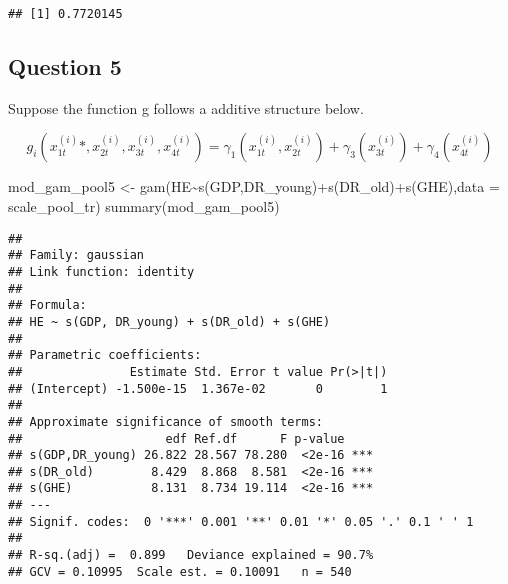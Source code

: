 \documentclass[
]{article}
\newenvironment{Shaded}{\begin{snugshade}}{\end{snugshade}}
\newcommand{\AttributeTok}[1]{\textcolor[rgb]{0.77,0.63,0.00}{#1}}
\newcommand{\DecValTok}[1]{\textcolor[rgb]{0.00,0.00,0.81}{#1}}
\newcommand{\FunctionTok}[1]{\textcolor[rgb]{0.00,0.00,0.00}{#1}}
\newcommand{\NormalTok}[1]{#1}
\newcommand{\OtherTok}[1]{\textcolor[rgb]{0.56,0.35,0.01}{#1}}
\newcommand{\SpecialCharTok}[1]{\textcolor[rgb]{0.00,0.00,0.00}{#1}}
\begin{document}
\begin{Shaded}
\end{Shaded}

\begin{verbatim}
## [1] 0.7720145
\end{verbatim}

\hypertarget{question-5}{%
\subsection{Question 5}\label{question-5}}

Suppose the function g follows a additive structure below.

\[
g_i(x^{(i)}_{1t}*,x^{(i)}_{2t}, x^{(i)}_{3t}, x^{(i)}_{4t}) = \gamma_1(x^{(i)}_{1t},x^{(i)}_{2t})+ \gamma_3(x^{(i)}_{3t})+\gamma_4(x^{(i)}_{4t}) 
\]

\begin{Shaded}
\begin{Highlighting}[]
\NormalTok{mod\_gam\_pool5 }\OtherTok{\textless{}{-}} \FunctionTok{gam}\NormalTok{(HE}\SpecialCharTok{\textasciitilde{}}\FunctionTok{s}\NormalTok{(GDP,DR\_young)}\SpecialCharTok{+}\FunctionTok{s}\NormalTok{(DR\_old)}\SpecialCharTok{+}\FunctionTok{s}\NormalTok{(GHE),}\AttributeTok{data =}\NormalTok{ scale\_pool\_tr)}
\FunctionTok{summary}\NormalTok{(mod\_gam\_pool5)}
\end{Highlighting}
\end{Shaded}

\begin{verbatim}
## 
## Family: gaussian 
## Link function: identity 
## 
## Formula:
## HE ~ s(GDP, DR_young) + s(DR_old) + s(GHE)
## 
## Parametric coefficients:
##               Estimate Std. Error t value Pr(>|t|)
## (Intercept) -1.500e-15  1.367e-02       0        1
## 
## Approximate significance of smooth terms:
##                    edf Ref.df      F p-value    
## s(GDP,DR_young) 26.822 28.567 78.280  <2e-16 ***
## s(DR_old)        8.429  8.868  8.581  <2e-16 ***
## s(GHE)           8.131  8.734 19.114  <2e-16 ***
## ---
## Signif. codes:  0 '***' 0.001 '**' 0.01 '*' 0.05 '.' 0.1 ' ' 1
## 
## R-sq.(adj) =  0.899   Deviance explained = 90.7%
## GCV = 0.10995  Scale est. = 0.10091   n = 540
\end{verbatim}
\end{document}
